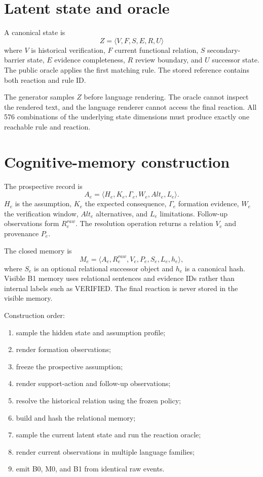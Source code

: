\documentclass[10.5pt]{article}
\begin{document}
\section{Latent state and oracle}
A canonical state is
\[
Z=\langle V,F,S,E,R,U\rangle
\]
where $V$ is historical verification, $F$ current functional relation, $S$ secondary-barrier state, $E$ evidence completeness, $R$ review boundary, and $U$ successor state. The public oracle applies the first matching rule. The stored reference contains both reaction and rule ID.

The generator samples $Z$ before language rendering. The oracle cannot inspect the rendered text, and the language renderer cannot access the final reaction. All 576 combinations of the underlying state dimensions must produce exactly one reachable rule and reaction.

\section{Cognitive-memory construction}
The prospective record is
\[
A_e=\langle H_e,K_e,\Gamma_e,W_e,Alt_e,L_e\rangle.
\]
$H_e$ is the assumption, $K_e$ the expected consequence, $\Gamma_e$ formation evidence, $W_e$ the verification window, $Alt_e$ alternatives, and $L_e$ limitations. Follow-up observations form $R_e^{raw}$. The resolution operation returns a relation $V_e$ and provenance $P_e$.

The closed memory is
\[
M_e=\langle A_e,R_e^{raw},V_e,P_e,S_e,L_e,h_e\rangle,
\]
where $S_e$ is an optional relational successor object and $h_e$ is a canonical hash. Visible B1 memory uses relational sentences and evidence IDs rather than internal labels such as VERIFIED. The final reaction is never stored in the visible memory.

Construction order:
\begin{enumerate}
\item sample the hidden state and assumption profile;
\item render formation observations;
\item freeze the prospective assumption;
\item render support-action and follow-up observations;
\item resolve the historical relation using the frozen policy;
\item build and hash the relational memory;
\item sample the current latent state and run the reaction oracle;
\item render current observations in multiple language families;
\item emit B0, M0, and B1 from identical raw events.
\end{enumerate}
\end{document}

